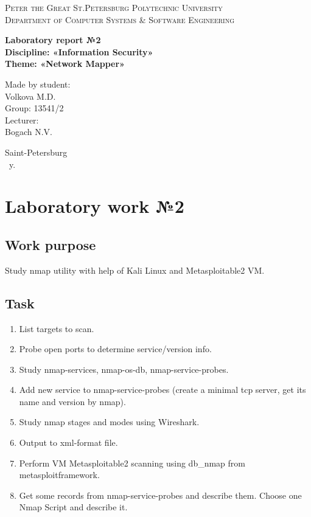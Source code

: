 \documentclass[14pt,a4paper,report]{report}
\begin{document}
\def\contentsname{Contents}

\begin{titlepage}
	\begin{center}
		\textsc{Peter the Great St.Petersburg Polytechnic University\\[5mm]
			Department of Computer Systems \& Software Engineering}
		
		\vfill
		
		\textbf{Laboratory report №2\\[3mm]
			Discipline: «Information Security»\\[3mm]
			Theme: «Network Mapper»\\[41mm]
		}
	\end{center}
	
	\hfill
	\begin{minipage}{.4\textwidth}
		Made by student:\\[2mm] 
		Volkova M.D.\\
		Group: 13541/2\\[5mm]
		
		Lecturer:\\[2mm] 
		Bogach N.V.
	\end{minipage}
	\vfill
	\begin{center}
		Saint-Petersburg\\ \the\year\ y.
	\end{center}
\end{titlepage}

\tableofcontents
\clearpage

\chapter{Laboratory work №2}

\section{Work purpose}

Study nmap utility with help of Kali Linux and Metasploitable2 VM.

\section{Task}

\begin{enumerate}
	\item List targets to scan.
	\item Probe open ports to determine service/version info.
	\item Study nmap-services, nmap-os-db, nmap-service-probes.
	\item Add new service to nmap-service-probes (create a minimal tcp server, get its name and version by nmap).
	\item Study nmap stages and modes using Wireshark.
	\item Output to xml-format file.
	\item Perform VM Metasploitable2 scanning using db\_nmap from metasploitframework.
	\item Get some records from nmap-service-probes and describe them. Choose one Nmap Script and describe it.
\end{enumerate}
\end{document}
